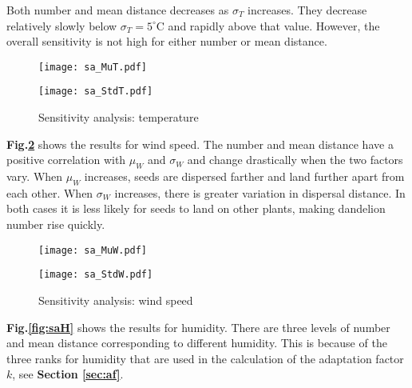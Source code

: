 \documentclass[12pt]{article}
\begin{document}
			Both number and mean distance decreases as $\sigma_T$ increases.  They decrease relatively slowly below $\sigma_T = 5^\circ$C and rapidly above that value.  However, the overall sensitivity is not high for either number or mean distance.
			
			\begin{figure}[htbp]
				\centering
				\begin{minipage}{0.04\textwidth}\end{minipage}
				\begin{minipage}{0.46\textwidth}
					\texttt{[image: sa\_MuT.pdf]}
				\end{minipage}
				\begin{minipage}{0.46\textwidth}
					\texttt{[image: sa\_StdT.pdf]}
				\end{minipage}
				\begin{minipage}{0.04\textwidth}\end{minipage}
				\caption{Sensitivity analysis: temperature}
				\label{fig:saT}
			\end{figure}
			
			\textbf{Fig.\ref{fig:saW}} shows the results for wind speed.  The number and mean distance have a positive correlation with $\mu_W$ and $\sigma_W$ and change drastically when the two factors vary.  When $\mu_W$ increases, seeds are dispersed farther and land further apart from each other.  When $\sigma_W$ increases, there is greater variation in dispersal distance.  In both cases it is less likely for seeds to land on other plants, making dandelion number rise quickly.
			
			\begin{figure}[htbp]
				\centering
				\begin{minipage}{0.04\textwidth}\end{minipage}
				\begin{minipage}{0.46\textwidth}
					\texttt{[image: sa\_MuW.pdf]}
				\end{minipage}
				\begin{minipage}{0.46\textwidth}
					\texttt{[image: sa\_StdW.pdf]}
				\end{minipage}
				\caption{Sensitivity analysis: wind speed}
				\label{fig:saW}
			\end{figure}
			
			\textbf{Fig.\ref{fig:saH}} shows the results for humidity.  There are three levels of number and mean distance corresponding to different humidity.  This is because of the three ranks for humidity that are used in the calculation of the adaptation factor $k$, see \textbf{Section \ref{sec:af}}.
			
\end{document}
